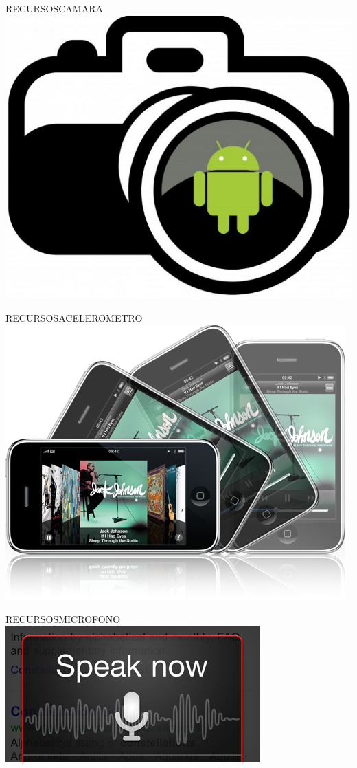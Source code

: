 \documentclass{beamer}
\begin{document}
\begin{frame}{RECURSOS}{CAMARA}
   \includegraphics[scale=0.5]{camara.jpeg}
\end{frame}

\begin{frame}{RECURSOS}{ACELEROMETRO}
   \includegraphics[scale=0.5]{acelerometro.png}
\end{frame}

\begin{frame}{RECURSOS}{MICROFONO}
   \includegraphics[scale=0.5]{voice.jpg}
\end{frame}
\end{document}
